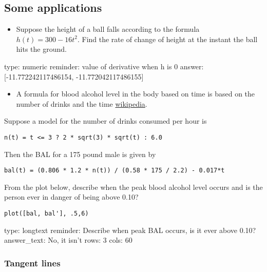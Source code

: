 \documentclass[12pt]{article}
\begin{document}
\subsection{Some applications}

\begin{itemize}
\itemsep1pt\parskip0pt
\item
  Suppose the height of a ball falls according to the formula
  $h(t) =   300 - 16t^2$. Find the rate of change of height at the
  instant the ball hits the ground.
\end{itemize}

\begin{answer}
    type: numeric
    reminder: value of derivative when h is 0
    answer: [-11.772242117486154, -11.772042117486155]

\end{answer}

\begin{itemize}
\itemsep1pt\parskip0pt
\item
  A formula for blood alcohol level in the body based on time is based
  on the number of drinks and the time
  \href{http://en.wikipedia.org/wiki/Blood_alcohol_content}{wikipedia}.
\end{itemize}

Suppose a model for the number of drinks consumed per hour is



\begin{verbatim}
n(t) = t <= 3 ? 2 * sqrt(3) * sqrt(t) : 6.0
\end{verbatim}
Then the BAL for a 175 pound male is given by



\begin{verbatim}
bal(t) = (0.806 * 1.2 * n(t)) / (0.58 * 175 / 2.2) - 0.017*t
\end{verbatim}
From the plot below, describe when the peak blood alcohol level occurs
and is the person ever in danger of being above 0.10?



\begin{verbatim}
plot([bal, bal'], .5,6)
\end{verbatim}
\begin{answer}
type: longtext
reminder: Describe when peak BAL occurs, is it ever above 0.10?
answer_text: No, it isn't 
rows: 3
cols: 60
\end{answer}

\subsubsection{Tangent lines}
\end{document}
